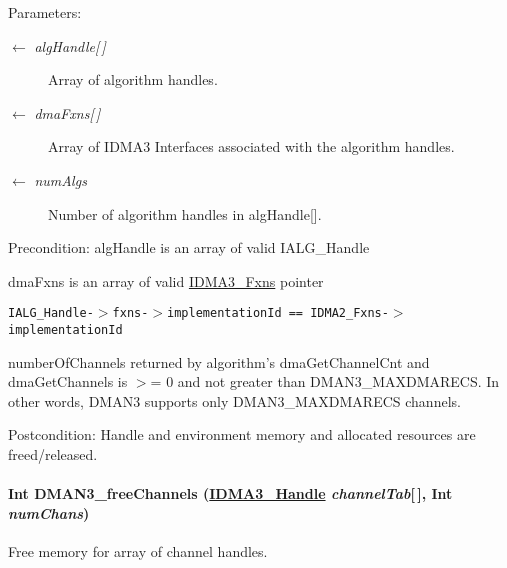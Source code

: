 \begin{Desc}
\item[Parameters:]
\begin{description}
\item[\mbox{$\leftarrow$} {\em alg\-Handle\mbox{[}$\,$\mbox{]}}]Array of algorithm handles. \item[\mbox{$\leftarrow$} {\em dma\-Fxns\mbox{[}$\,$\mbox{]}}]Array of IDMA3 Interfaces associated with the algorithm handles. \item[\mbox{$\leftarrow$} {\em num\-Algs}]Number of algorithm handles in alg\-Handle\mbox{[}\mbox{]}.\end{description}
\end{Desc}
\begin{Desc}
\item[Precondition:]alg\-Handle is an array of valid IALG\_\-Handle 

dma\-Fxns is an array of valid \hyperlink{struct_i_d_m_a3___fxns}{IDMA3\_\-Fxns} pointer 

{\tt IALG\_\-Handle-$>$fxns-$>$implementation\-Id == IDMA2\_\-Fxns-$>$implementation\-Id} 

number\-Of\-Channels returned by algorithm's dma\-Get\-Channel\-Cnt and dma\-Get\-Channels is $>$= 0 and not greater than DMAN3\_\-MAXDMARECS. In other words, DMAN3 supports only DMAN3\_\-MAXDMARECS channels.\end{Desc}
\begin{Desc}
\item[Postcondition:]Handle and environment memory and allocated resources are freed/released. \end{Desc}
\hypertarget{group___d_s_p_d_m_a_n3_g2d14c4952c1194b913ac6e8bb7f0e9d5}{
\paragraph[DMAN3\_\-freeChannels]{\setlength{\rightskip}{0pt plus 5cm}Int DMAN3\_\-free\-Channels (\hyperlink{struct_i_d_m_a3___obj}{IDMA3\_\-Handle} {\em channel\-Tab}\mbox{[}$\,$\mbox{]}, Int {\em num\-Chans})}\hfill}
\label{group___d_s_p_d_m_a_n3_g2d14c4952c1194b913ac6e8bb7f0e9d5}


Free memory for array of channel handles. 

